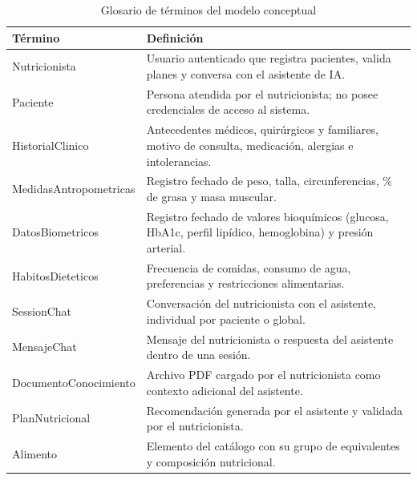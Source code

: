 \begin{table}[H]
\centering\small
\caption{Glosario de términos del modelo conceptual}\label{tab:glosario}
\begin{tabularx}{\linewidth}{|p{3.8cm}|X|}
\hline
\textbf{Término} & \textbf{Definición} \\ \hline
Nutricionista & Usuario autenticado que registra pacientes, valida planes y conversa con el asistente de IA. \\ \hline
Paciente & Persona atendida por el nutricionista; no posee credenciales de acceso al sistema. \\ \hline
HistorialClinico & Antecedentes médicos, quirúrgicos y familiares, motivo de consulta, medicación, alergias e intolerancias. \\ \hline
MedidasAntropometricas & Registro fechado de peso, talla, circunferencias, \% de grasa y masa muscular. \\ \hline
DatosBiometricos & Registro fechado de valores bioquímicos (glucosa, HbA1c, perfil lipídico, hemoglobina) y presión arterial. \\ \hline
HabitosDieteticos & Frecuencia de comidas, consumo de agua, preferencias y restricciones alimentarias. \\ \hline
SessionChat & Conversación del nutricionista con el asistente, individual por paciente o global. \\ \hline
MensajeChat & Mensaje del nutricionista o respuesta del asistente dentro de una sesión. \\ \hline
DocumentoConocimiento & Archivo PDF cargado por el nutricionista como contexto adicional del asistente. \\ \hline
PlanNutricional & Recomendación generada por el asistente y validada por el nutricionista. \\ \hline
Alimento & Elemento del catálogo con su grupo de equivalentes y composición nutricional. \\ \hline
\end{tabularx}
\end{table}
